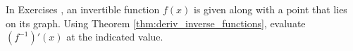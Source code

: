 {\noindent In Exercises}
{, an invertible function $f(x)$ is given along with a point that lies on its graph. Using Theorem \ref{thm:deriv_inverse_functions}, evaluate $\left(f^{-1}\right)'(x)$ at the  indicated value.}
